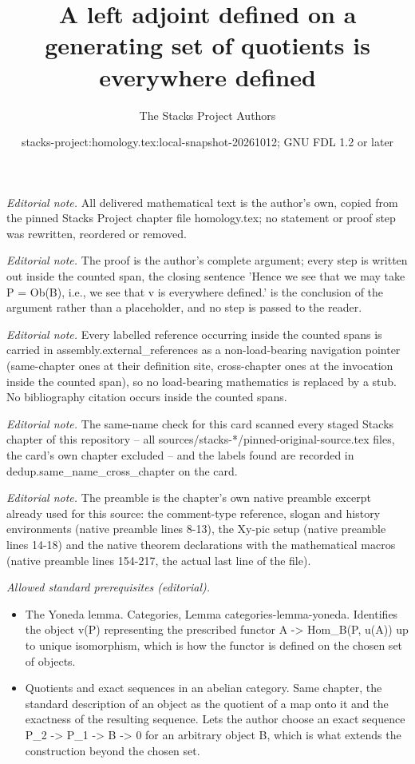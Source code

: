 \documentclass[10pt,a4paper]{amsart}
\title{A left adjoint defined on a generating set of quotients is everywhere defined}
\author{The Stacks Project Authors}
\date{stacks-project:homology.tex:local-snapshot-20261012; GNU FDL 1.2 or later}
\theoremstyle{plain}
\theoremstyle{definition}
\theoremstyle{remark}
\numberwithin{equation}{subsection}
\begin{document}
\maketitle
\noindent\textit{Editorial note.} All delivered mathematical text is the author's own, copied from the pinned Stacks Project chapter file homology.tex; no statement or proof step was rewritten, reordered or removed.\par\medskip
\noindent\textit{Editorial note.} The proof is the author's complete argument; every step is written out inside the counted span, the closing sentence 'Hence we see that we may take P = Ob(B), i.e., we see that v is everywhere defined.' is the conclusion of the argument rather than a placeholder, and no step is passed to the reader.\par\medskip
\noindent\textit{Editorial note.} Every labelled reference occurring inside the counted spans is carried in assembly.external\_references as a non-load-bearing navigation pointer (same-chapter ones at their definition site, cross-chapter ones at the invocation inside the counted span), so no load-bearing mathematics is replaced by a stub. No bibliography citation occurs inside the counted spans.\par\medskip
\noindent\textit{Editorial note.} The same-name check for this card scanned every staged Stacks chapter of this repository -- all sources/stacks-*/pinned-original-source.tex files, the card's own chapter excluded -- and the labels found are recorded in dedup.same\_name\_cross\_chapter on the card.\par\medskip
\noindent\textit{Editorial note.} The preamble is the chapter's own native preamble excerpt already used for this source: the comment-type reference, slogan and history environments (native preamble lines 8-13), the Xy-pic setup (native preamble lines 14-18) and the native theorem declarations with the mathematical macros (native preamble lines 154-217, the actual last line of the file).\par\medskip
\noindent\textit{Allowed standard prerequisites (editorial).}\begin{itemize}
\item The Yoneda lemma. Categories, Lemma categories-lemma-yoneda. Identifies the object v(P) representing the prescribed functor A -> Hom\_B(P, u(A)) up to unique isomorphism, which is how the functor is defined on the chosen set of objects.
\item Quotients and exact sequences in an abelian category. Same chapter, the standard description of an object as the quotient of a map onto it and the exactness of the resulting sequence. Lets the author choose an exact sequence P\_2 -> P\_1 -> B -> 0 for an arbitrary object B, which is what extends the construction beyond the chosen set.
\end{itemize}\medskip
\end{document}
